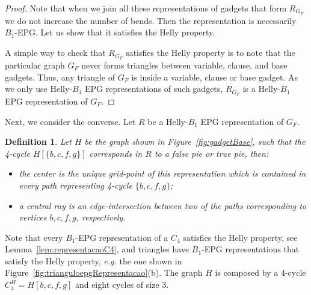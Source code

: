 \documentclass[
submission
]{dmtcs-episciences}
\newtheorem{definition}[theorem]{Definition}
\begin{document}
\begin{proof}

Note that when we join all these representations of gadgets that form $ R_{G_F} $ we do not increase the number of  bends. Then the representation is necessarily  $B_1$-EPG. Let us show that it satisfies the Helly property. 

A simple way to check that $ R_{G_F} $ satisfies the Helly property  is to note that the particular graph $G_F$ never forms triangles between variable, clause, and base gadgets. Thus, any triangle of $G_F$ is inside a variable, clause or base gadget. As we only use Helly-$B_1$ EPG representations of such gadgets, $ R_{G_F} $ is a Helly-$B_1$ EPG representation of $G_F$.
 \end{proof}

Next, we consider the converse. Let $R$ be a Helly-$B_1$ EPG representation  of $G_F$.




\begin{definition}
Let $H$ be the graph shown in Figure~\ref{fig:gadgetBase}, such that the 4-cycle $H[\{b, c, f, g \}]$ corresponds in $R$ to a false pie or true pie, then:

\begin{itemize}
\item the \emph{center} is the unique grid-point of this representation which is contained in every path representing 4-cycle $ \{b, c, f, g \}$; \label{lab:lab1}

\item a \emph {central ray} is an edge-intersection  between two of the paths corresponding to vertices  $ b, c, f, g$, respectively.
\end{itemize}
\end{definition}

Note that every $B_1$-EPG representation of a $C_4$ satisfies the Helly property, see Lemma~\ref{lem:representacaoC4}, and triangles have $B_1$-EPG representations that satisfy the Helly property, \textit{e.g.} the one shown in Figure~\ref{fig:trianguloepgRepresentacao}(b). The graph $H$ is composed by a 4-cycle  $C_4^{H}=H[b, c, f, g]$ and eight cycles of size 3.%
\end{document}
